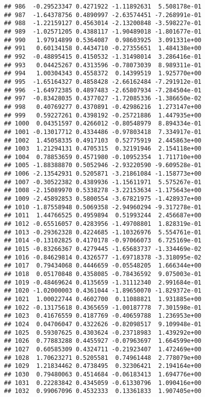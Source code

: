 \documentclass[
]{article}
\begin{document}
\begin{verbatim}
## 986  -0.29523347 0.4271922 -1.11892631  5.508178e-01
## 987  -1.64378756 0.4890997 -2.63574451 -7.268991e-01
## 988  -1.22159127 0.4563014 -2.13200848 -3.598227e-01
## 989  -1.02571205 0.4388117 -1.90489018 -1.801677e-01
## 990   1.97914899 0.5364087  0.98603925  3.091331e+00
## 991   0.60134158 0.4434710 -0.27355651  1.484138e+00
## 992  -0.48895415 0.4150532 -1.31498014  3.286416e-01
## 993   0.04425267 0.4313596 -0.78073039  8.989311e-01
## 994   1.00304343 0.4558372  0.14399519  1.925770e+00
## 995  -1.65164327 0.4858428 -2.66162484 -7.291912e-01
## 996  -1.64972385 0.4897483 -2.65807934 -7.284504e-01
## 997  -0.83428035 0.4377027 -1.72085336 -1.386650e-02
## 998   0.40769277 0.4370891 -0.42986216  1.273147e+00
## 999   0.59227261 0.4398192 -0.25721886  1.447935e+00
## 1000  0.04351597 0.4266012 -0.80548979  8.894334e-01
## 1001 -0.13017712 0.4334486 -0.97803418  7.334917e-01
## 1002  1.45058335 0.4917103  0.52775919  2.445863e+00
## 1003  1.21294131 0.4705315  0.32191946  2.154118e+00
## 1004  0.78853659 0.4571980 -0.10952354  1.711710e+00
## 1005 -1.88388870 0.5052946 -2.93220590 -9.609528e-01
## 1006 -2.13542931 0.5205871 -3.21861084 -1.158773e+00
## 1007 -0.30522382 0.4389936 -1.15611971  5.575267e-01
## 1008 -2.15089970 0.5338278 -3.22153634 -1.175643e+00
## 1009 -2.45892853 0.5800554 -3.67821975 -1.428937e+00
## 1010 -1.87558948 0.5069358 -2.94960294 -9.317278e-01
## 1011  1.44766525 0.4959894  0.51993244  2.456687e+00
## 1012 -0.65516057 0.4283956 -1.49708801  1.828319e-01
## 1013 -0.29362328 0.4224685 -1.10326976  5.554761e-01
## 1014 -0.13102825 0.4170178 -0.97066073  6.725169e-01
## 1015 -0.83266367 0.4279445 -1.65683737 -1.334469e-02
## 1016 -0.84629814 0.4326577 -1.69718378 -3.318095e-02
## 1017  0.79434068 0.4446659 -0.05548205  1.666344e+00
## 1018  0.05170848 0.4358085 -0.78436592  9.075003e-01
## 1019 -0.48469624 0.4135659 -1.31112340  2.991684e-01
## 1020 -1.02000003 0.4361044 -1.89650070 -1.829372e-01
## 1021  1.00022744 0.4602700  0.11088821  1.931885e+00
## 1022 -0.13175618 0.4365659 -1.00187778  7.301598e-01
## 1023  0.41676559 0.4187769 -0.40659788  1.236953e+00
## 1024  0.04706047 0.4322626 -0.82098517  9.109948e-01
## 1025  0.59307625 0.4303624 -0.23718983  1.439292e+00
## 1026  0.77883288 0.4455927 -0.07963697  1.664599e+00
## 1027  0.60585309 0.4324711 -0.21923407  1.472469e+00
## 1028  1.70623271 0.5205581  0.74961448  2.778079e+00
## 1029  1.21834462 0.4738495  0.32306421  2.194164e+00
## 1030  0.79480063 0.4514684 -0.06183413  1.694776e+00
## 1031  0.22283842 0.4345059 -0.61330796  1.090416e+00
## 1032  0.99067096 0.4532333  0.13361833  1.907405e+00

\end{verbatim}
\end{document}
